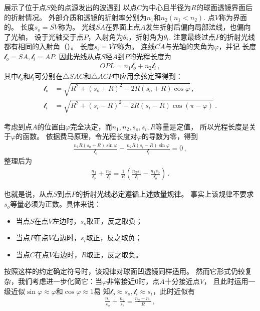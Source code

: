 展示了位于点$S$处的点源发出的波遇到
以点$C$为中心且半径为$R$的球面透镜界面后的折射情况。
外部介质和透镜的折射率分别为$n_1$和$n_2 (n_1<n_2)$.
点$V$称为界面的。
长度$s_o=\overline{SV}$称为。
光线$\overline{SA}$在界面上点$A$发生折射后偏向局部法线，也偏向了光轴，
设于光轴交于点$P$，入射角为$\theta_i$，折射角为$\theta_t$.
注意最终过点$P$的折射光线都有相同的入射角（）。
长度$s_i=\overline{VP}$称为。
连线$\overline{CA}$与光轴的夹角为$\varphi$，并记
长度$\mathcal{l}_o=\overline{SA}, \mathcal{l}_i=\overline{AP}$.
因此光线从点$S$经$A$到$P$的光程长度为
\begin{align}
    OPL=n_1\mathcal{l}_o+n_2\mathcal{l}_i\, ,
\end{align}
其中$\mathcal{l}_o$和$\mathcal{l}_i$可分别在$\triangle SAC$和$\triangle ACP$中应用余弦定理得到：
\begin{align}
    \mathcal{l}_o & =\sqrt{R^2+(s_o+R)^2-2R(s_o+R)\cos\varphi}\, ,       \\
    \mathcal{l}_i & =\sqrt{R^2+(s_i-R)^2-2R(s_i-R)\cos(\pi-\varphi)}\, .
\end{align}

考虑到点$A$的位置由$\varphi$完全决定，而$n_1, n_2, s_o, s_i, R$等量是定值，
所以光程长度是关于$\varphi$的函数。
依据费马原理，令光程长度对$\varphi$的导数为零，得到
\begin{align}
    \frac{n_1R(s_o+R)\sin\varphi}{\mathcal{l}_o}-\frac{n_2R(s_i-R)\sin\varphi}{\mathcal{l}_i}=0\, ,
\end{align}
整理后为
\begin{align}
    \frac{n_1}{\mathcal{l}_o}+\frac{n_2}{\mathcal{l}_i}=\frac{1}{R}\left(\frac{n_2s_i}{\mathcal{l}_i}-\frac{n_1s_o}{\mathcal{l}_o}\right)\, .
\end{align}

也就是说，从点$S$到点$P$的折射光线必定遵循上述数量规律。
事实上该规律不要求$s_o$等量必须为正数。具体来说：
\begin{itemize}
    \item 当点$S$在点$V$左边时，$s_o$取正，反之取负；
    \item 当点$P$在点$V$右边时，$s_i$取正，反之取负；
    \item 当点$C$在点$V$右边时，$R$取正，反之取负。
\end{itemize}

按照这样的约定确定符号时，该规律对球面凹透镜同样适用。
然而它形式仍较复杂，我们考虑进一步化简它：当$\varphi$非常接近0时，点$A$十分接近点$V$，
且此时运用一级近似$\sin\varphi\approx\varphi$和$\cos\varphi\approx 1$易
知$\mathcal{l}_o\approx s_o, \mathcal{l}_i\approx s_i$，此时近似有
\begin{align}\label{eq:6.24}
    \frac{n_1}{s_o}+\frac{n_2}{s_i}=\frac{n_2-n_1}{R}\, ,
\end{align}

